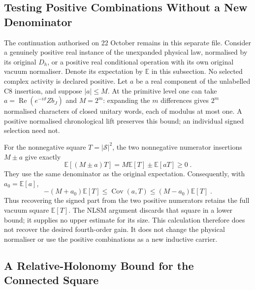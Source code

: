 \documentclass[11pt]{article}
\begin{document}
\subsection{Testing Positive Combinations Without a New Denominator}

The continuation authorised on 22 October remains in this separate file.
Consider a genuinely positive real instance of the unexpanded physical
law, normalised by its original $D_h$, or a positive real conditional
operation with its own original vacuum normaliser. Denote its expectation
by $\mathbb E$ in this subsection. No selected complex activity is
declared positive. Let $a$ be a real component of the unlabelled C8
insertion, and suppose $|a|\leq M$. At the primitive level one can take
$a=\operatorname{Re}(e^{-i\vartheta}Zb_J)$ and $M=2^m$: expanding the
$m$ differences gives $2^m$ normalised characters of closed unitary
words, each of modulus at most one. A positive normalised chronological
lift preserves this bound; an individual signed selection need not.

For the nonnegative square $T=|\mathcal S|^2$, the two nonnegative
numerator insertions $M\pm a$ give exactly
\begin{equation}\label{eq:c8-fourth-positive-shifts}
    \mathbb E[(M\pm a)T]=M\mathbb E[T]\pm\mathbb E[aT]\geq 0\;.
\end{equation}
They use the same denominator as the original expectation. Consequently,
with $a_0=\mathbb E[a]$,
\begin{equation}\label{eq:c8-fourth-shift-cost}
    -(M+a_0)\mathbb E[T]\leq
        \operatorname{Cov}(a,T)
        \leq(M-a_0)\mathbb E[T]\;.
\end{equation}
Thus recovering the signed part from the two positive numerators
retains the full vacuum square $\mathbb E[T]$. The NLSM argument
discards that square in a lower bound; it supplies no upper estimate
for its size. This calculation therefore does not recover the desired
fourth-order gain. It does not change the physical normaliser or use
the positive combinations as a new inductive carrier.

\subsection{A Relative-Holonomy Bound for the Connected Square}
\label{sec:c8-fourth-deficit}
\end{document}
